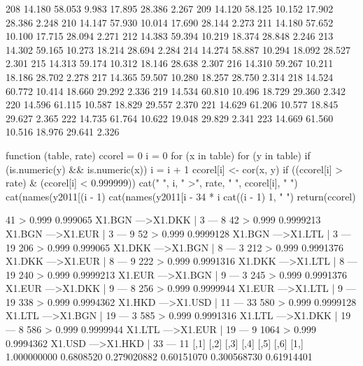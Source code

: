 \documentclass[a4paper,11pt]{scrartcl}
\begin{document}
\begin{Schunk}
\begin{Soutput}
208 14.180   58.053  9.983 17.895 28.386  2.267
209 14.120   58.125 10.152 17.902 28.386  2.248
210 14.147   57.930 10.014 17.690 28.144  2.273
211 14.180   57.652 10.100 17.715 28.094  2.271
212 14.383   59.394 10.219 18.374 28.848  2.246
213 14.302   59.165 10.273 18.214 28.694  2.284
214 14.274   58.887 10.294 18.092 28.527  2.301
215 14.313   59.174 10.312 18.146 28.638  2.307
216 14.310   59.267 10.211 18.186 28.702  2.278
217 14.365   59.507 10.280 18.257 28.750  2.314
218 14.524   60.772 10.414 18.660 29.292  2.336
219 14.534   60.810 10.496 18.729 29.360  2.342
220 14.596   61.115 10.587 18.829 29.557  2.370
221 14.629   61.206 10.577 18.845 29.627  2.365
222 14.735   61.764 10.622 19.048 29.829  2.341
223 14.669   61.560 10.516 18.976 29.641  2.326
\end{Soutput}
\begin{Soutput}
function (table, rate) 
{
    ccorel = 0
    i = 0
    for (x in table) {
        for (y in table) {
            if (is.numeric(y) && is.numeric(x)) {
                i = i + 1
                ccorel[i] <- cor(x, y)
                if ((ccorel[i] > rate) & (ccorel[i] < 0.999999)) {
                  cat(" ", i, " >", rate, " ", ccorel[i], " ")
                  cat(names(y2011[(i - 1)%
                  cat(names(y2011[i - 34 * i%
                  cat((i - 1)%
                    1, "  \n")
                }
            }
        }
    }
    return(ccorel)
}
\end{Soutput}
\begin{Soutput}
  41  > 0.999   0.999065  X1.BGN  --->X1.DKK | 3 --- 8   
  42  > 0.999   0.9999213  X1.BGN  --->X1.EUR | 3 --- 9   
  52  > 0.999   0.9999128  X1.BGN  --->X1.LTL | 3 --- 19   
  206  > 0.999   0.999065  X1.DKK  --->X1.BGN | 8 --- 3   
  212  > 0.999   0.9991376  X1.DKK  --->X1.EUR | 8 --- 9   
  222  > 0.999   0.9991316  X1.DKK  --->X1.LTL | 8 --- 19   
  240  > 0.999   0.9999213  X1.EUR  --->X1.BGN | 9 --- 3   
  245  > 0.999   0.9991376  X1.EUR  --->X1.DKK | 9 --- 8   
  256  > 0.999   0.9999944  X1.EUR  --->X1.LTL | 9 --- 19   
  338  > 0.999   0.9994362  X1.HKD  --->X1.USD | 11 --- 33   
  580  > 0.999   0.9999128  X1.LTL  --->X1.BGN | 19 --- 3   
  585  > 0.999   0.9991316  X1.LTL  --->X1.DKK | 19 --- 8   
  586  > 0.999   0.9999944  X1.LTL  --->X1.EUR | 19 --- 9   
  1064  > 0.999   0.9994362  X1.USD  --->X1.HKD | 33 --- 11   
              [,1]       [,2]         [,3]        [,4]         [,5]        [,6]
 [1,]  1.000000000  0.6808520  0.279020882  0.60151070  0.300568730  0.61914401

\end{Soutput}
\end{Schunk}
\end{document}
